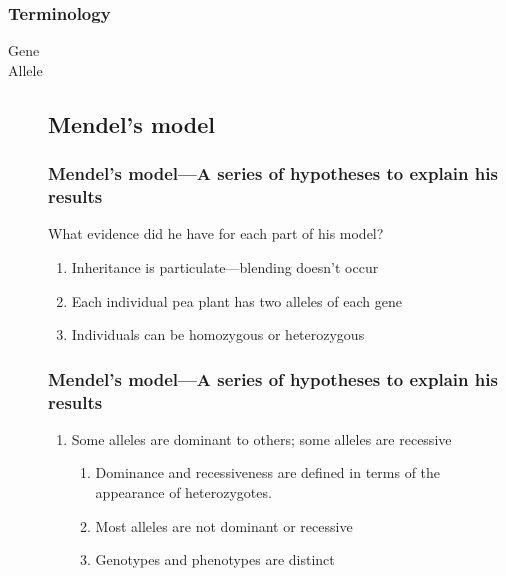 \begin{frame}
    \frametitle{Terminology}
    \begin{description}
        \item[Gene] 
        \item[Allele] 
\subsection{Mendel's model}

\begin{frame}
    \frametitle{Mendel's model---A series of hypotheses to explain his results}
    What evidence did he have for each part of his model?

    \begin{enumerate}[<+->]
        \item Inheritance is particulate---blending doesn't occur
        \item Each individual pea plant has two alleles of each gene
        \item Individuals can be homozygous or heterozygous
    \end{enumerate}
\end{frame}

\begin{frame}
    \frametitle{Mendel's model---A series of hypotheses to explain his results}
    \begin{enumerate}[<+->]
        \item Some alleles are dominant to others; some alleles are recessive
            \begin{enumerate}[NOTE]
                \item Dominance and recessiveness are defined 
                    in terms of the appearance of heterozygotes.
                \item Most alleles are not dominant or recessive
                \item Genotypes and phenotypes are distinct
            \end{enumerate}
    \end{enumerate}


\end{frame}
\end{description}
\end{frame}
